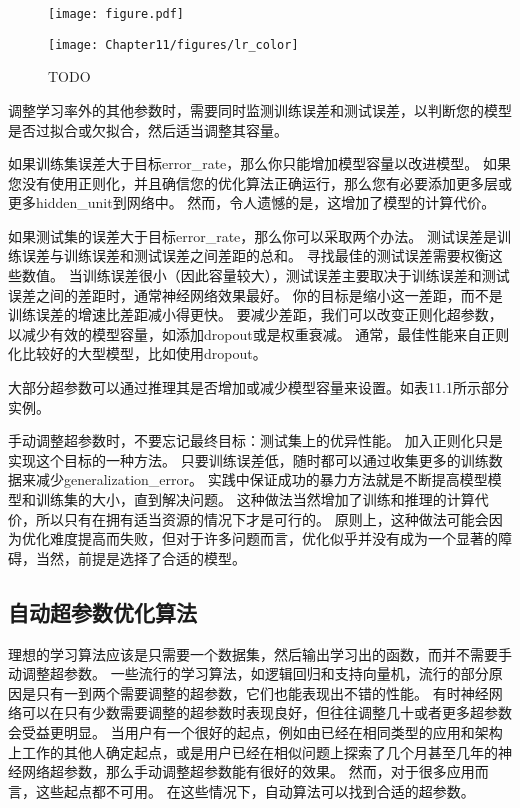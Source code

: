 \begin{figure}[!htb]
\ifOpenSource
\centerline{\texttt{[image: figure.pdf]}}
\else
\centerline{\texttt{[image: Chapter11/figures/lr\_color]}}
\fi
\caption{TODO}
\label{fig:chap11_lr}
\end{figure}

调整学习率外的其他参数时，需要同时监测训练误差和测试误差，以判断您的模型是否过拟合或欠拟合，然后适当调整其容量。

如果训练集误差大于目标\gls{error_rate}，那么你只能增加模型容量以改进模型。
如果您没有使用正则化，并且确信您的优化算法正确运行，那么您有必要添加更多层或更多\gls{hidden_unit}到网络中。
然而，令人遗憾的是，这增加了模型的计算代价。


如果测试集的误差大于目标\gls{error_rate}，那么你可以采取两个办法。
测试误差是训练误差与训练误差和测试误差之间差距的总和。
寻找最佳的测试误差需要权衡这些数值。
当训练误差很小（因此容量较大），测试误差主要取决于训练误差和测试误差之间的差距时，通常神经网络效果最好。
你的目标是缩小这一差距，而不是训练误差的增速比差距减小得更快。
要减少差距，我们可以改变正则化超参数，以减少有效的模型容量，如添加\gls{dropout}或是权重衰减。
通常，最佳性能来自正则化比较好的大型模型，比如使用\gls{dropout}。

大部分超参数可以通过推理其是否增加或减少模型容量来设置。如表11.1所示部分实例。

手动调整超参数时，不要忘记最终目标：测试集上的优异性能。
加入正则化只是实现这个目标的一种方法。
只要训练误差低，随时都可以通过收集更多的训练数据来减少\gls{generalization_error}。
实践中保证成功的暴力方法就是不断提高模型模型和训练集的大小，直到解决问题。
这种做法当然增加了训练和推理的计算代价，所以只有在拥有适当资源的情况下才是可行的。
原则上，这种做法可能会因为优化难度提高而失败，但对于许多问题而言，优化似乎并没有成为一个显著的障碍，当然，前提是选择了合适的模型。


\subsection{自动超参数优化算法}
\label{subsec:automatic_hyperparameter_optimization_algorithms}
理想的学习算法应该是只需要一个数据集，然后输出学习出的函数，而并不需要手动调整超参数。
一些流行的学习算法，如逻辑回归和支持向量机，流行的部分原因是只有一到两个需要调整的超参数，它们也能表现出不错的性能。
有时神经网络可以在只有少数需要调整的超参数时表现良好，但往往调整几十或者更多超参数会受益更明显。
当用户有一个很好的起点，例如由已经在相同类型的应用和架构上工作的其他人确定起点，或是用户已经在相似问题上探索了几个月甚至几年的神经网络超参数，那么手动调整超参数能有很好的效果。
然而，对于很多应用而言，这些起点都不可用。
在这些情况下，自动算法可以找到合适的超参数。

